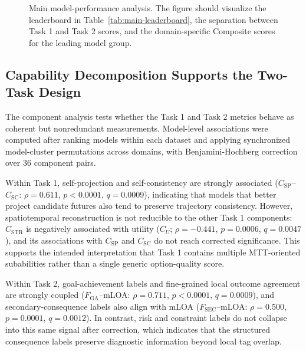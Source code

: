 \documentclass[pdflatex,sn-mathphys-num]{sn-jnl}%
\theoremstyle{thmstyleone}%
\theoremstyle{thmstyletwo}%
\theoremstyle{thmstylethree}%
\begin{document}
\begin{figure}[htbp]
\centering
{}
\caption{Main model-performance analysis. The figure should visualize the leaderboard in Table~\ref{tab:main-leaderboard}, the separation between Task 1 and Task 2 scores, and the domain-specific Composite scores for the leading model group.}
\label{fig:results-main-models}
\end{figure}

\subsection{Capability Decomposition Supports the Two-Task Design}
The component analysis tests whether the Task 1 and Task 2 metrics behave as coherent but nonredundant measurements. Model-level associations were computed after ranking models within each dataset and applying synchronized model-cluster permutations across domains, with Benjamini-Hochberg correction over 36 component pairs.

Within Task 1, self-projection and self-consistency are strongly associated ($C_{\mathrm{SP}}$--$C_{\mathrm{SC}}$: $\rho=0.611$, $p<0.0001$, $q=0.0009$), indicating that models that better project candidate futures also tend to preserve trajectory consistency. However, spatiotemporal reconstruction is not reducible to the other Task 1 components: $C_{\mathrm{STR}}$ is negatively associated with utility ($C_U$; $\rho=-0.441$, $p=0.0006$, $q=0.0047$), and its associations with $C_{\mathrm{SP}}$ and $C_{\mathrm{SC}}$ do not reach corrected significance. This supports the intended interpretation that Task 1 contains multiple MTT-oriented subabilities rather than a single generic option-quality score.

Within Task 2, goal-achievement labels and fine-grained local outcome agreement are strongly coupled ($F_{\mathrm{GA}}$--mLOA: $\rho=0.711$, $p<0.0001$, $q=0.0009$), and secondary-consequence labels also align with mLOA ($F_{\mathrm{SEC}}$--mLOA: $\rho=0.500$, $p=0.0001$, $q=0.0012$). In contrast, risk and constraint labels do not collapse into this same signal after correction, which indicates that the structured consequence labels preserve diagnostic information beyond local tag overlap.
\end{document}
